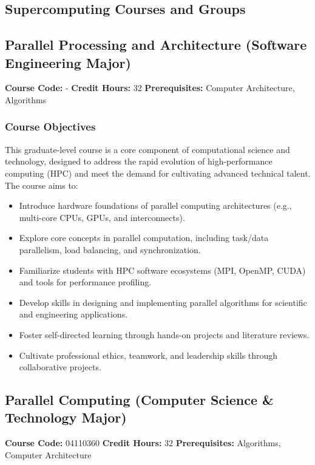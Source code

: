 \documentclass[a4paper,12pt]{article}
\begin{document}
\subsection{Supercomputing Courses and Groups}

\subsection*{Parallel Processing and Architecture (Software Engineering Major)}
\textbf{Course Code:} - \quad \textbf{Credit Hours:} 32 \quad \textbf{Prerequisites:} Computer Architecture, Algorithms

\subsubsection*{Course Objectives}
This graduate-level course is a core component of computational science and technology, designed to address the rapid evolution of high-performance computing (HPC) and meet the demand for cultivating advanced technical talent. The course aims to:
\begin{itemize}
    \item Introduce hardware foundations of parallel computing architectures (e.g., multi-core CPUs, GPUs, and interconnects).
    \item Explore core concepts in parallel computation, including task/data parallelism, load balancing, and synchronization.
    \item Familiarize students with HPC software ecosystems (MPI, OpenMP, CUDA) and tools for performance profiling.
    \item Develop skills in designing and implementing parallel algorithms for scientific and engineering applications.
    \item Foster self-directed learning through hands-on projects and literature reviews.
    \item Cultivate professional ethics, teamwork, and leadership skills through collaborative projects.
\end{itemize}


\subsection*{Parallel Computing (Computer Science \& Technology Major)}
\textbf{Course Code:} 04110360 \quad \textbf{Credit Hours:} 32 \quad \textbf{Prerequisites:} Algorithms, Computer Architecture
\end{document}
